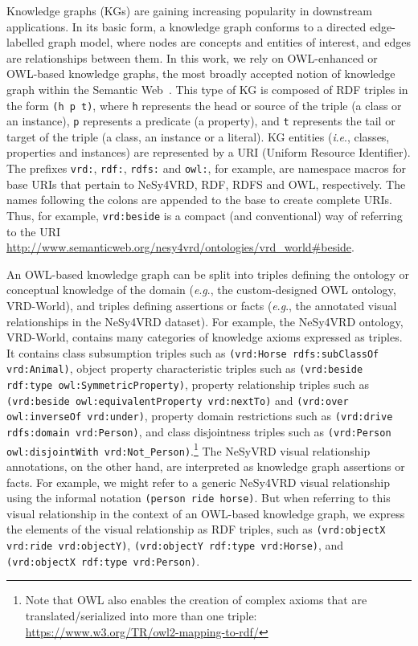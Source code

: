 \documentclass[]{jair}
\newcommand{\ie}{\textit{i}.\textit{e}.,\xspace}
\newcommand{\eg}{\textit{e}.\textit{g}.,\xspace}
\begin{document}
Knowledge graphs (KGs) are gaining increasing popularity in downstream applications. In its basic form, a knowledge graph conforms to a directed edge-labelled graph model, where nodes are concepts and entities of interest, and edges are relationships between them.
In this work, we rely on OWL-enhanced or OWL-based knowledge graphs, the most broadly accepted notion of knowledge graph within the Semantic Web~\cite{Hogan2021-KGBook}.
This type of KG is composed of RDF triples in the form \texttt{(h  p  t)}, where \texttt{h} represents the head or source of the triple (a class or an instance), \texttt{p} represents a predicate (a property), and \texttt{t} represents the tail or target of the triple (a class, an instance or a literal). 
KG entities (\ie classes, properties and instances) are represented by a URI (Uniform Resource Identifier). The prefixes \texttt{vrd:}, \texttt{rdf:}, \texttt{rdfs:} and \texttt{owl:}, for example, are namespace macros for base URIs that pertain to NeSy4VRD, RDF, RDFS and OWL, respectively. The names following the colons are appended to the base to create complete URIs. Thus, for example, \texttt{vrd:beside} is a compact (and conventional) way of referring to the URI  \url{http://www.semanticweb.org/nesy4vrd/ontologies/vrd_world#beside}.

An OWL-based knowledge graph can be split into triples defining the ontology or conceptual knowledge of the domain (\eg the custom-designed OWL ontology, VRD-World), and triples defining assertions or facts (\eg the annotated visual relationships in the NeSy4VRD dataset).
For example, the NeSy4VRD ontology, VRD-World, contains many categories of knowledge axioms expressed as triples.
It contains class subsumption triples such as \texttt{(vrd:Horse  rdfs:subClassOf vrd:Animal)}, object property characteristic triples such as \texttt{(vrd:beside rdf:type owl:SymmetricProperty)}, property relationship triples such as \texttt{(vrd:beside owl:equivalentProperty vrd:nextTo)} and \texttt{(vrd:over owl:inverseOf vrd:under)}, property domain restrictions such as \texttt{(vrd:drive rdfs:domain vrd:Person)}, and class disjointness triples such as \texttt{(vrd:Person owl:disjointWith vrd:Not\_Person)}.\footnote{Note that OWL also enables the creation of complex axioms that are translated/serialized into more than one triple: \url{https://www.w3.org/TR/owl2-mapping-to-rdf/}} 
The NeSyVRD visual relationship annotations, on the other hand, are interpreted as knowledge graph assertions or facts.
For example, we might refer to a generic NeSy4VRD visual relationship using the informal notation \texttt{(person ride horse)}.
But when referring to this visual relationship in the context of an OWL-based knowledge graph, we express the elements of the visual relationship as RDF triples, such as \texttt{(vrd:objectX vrd:ride vrd:objectY)}, \texttt{(vrd:objectY rdf:type vrd:Horse)}, and \texttt{(vrd:objectX rdf:type vrd:Person)}.
\end{document}
